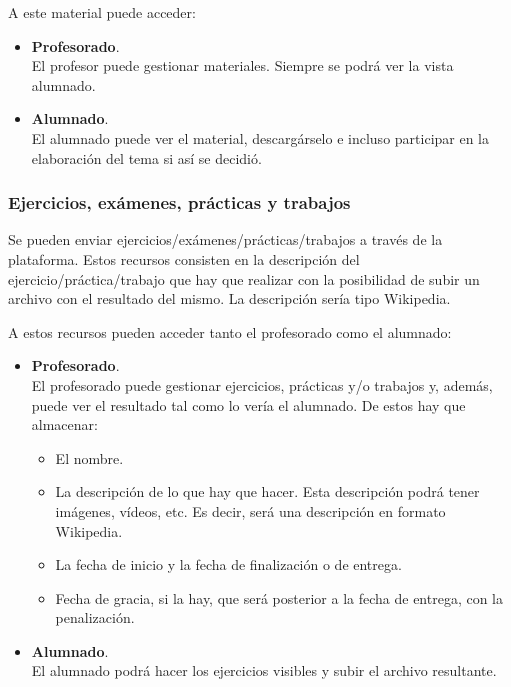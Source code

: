 \documentclass[12pt,twoside,a4paper]{article}
\begin{document}
A este material puede acceder:
\begin{itemize}
\item \textbf{Profesorado}.\\
El profesor puede gestionar materiales. Siempre se podrá ver la vista alumnado.
\item \textbf{Alumnado}.\\
El alumnado puede ver el material, descargárselo e incluso participar en la elaboración del tema si así se decidió.
\end{itemize}

\subsubsection{Ejercicios, exámenes, prácticas y trabajos}
Se pueden enviar ejercicios/exámenes/prácticas/trabajos a través de la plataforma. Estos recursos consisten en la descripción del ejercicio/práctica/trabajo que hay que realizar con la posibilidad de subir un archivo con el resultado del mismo. La descripción sería tipo Wikipedia.

A estos recursos pueden acceder tanto el profesorado como el alumnado:
\begin{itemize}
\item \textbf{Profesorado}.\\
  El profesorado puede gestionar ejercicios, prácticas y/o trabajos y, además, puede ver el resultado tal como lo vería el alumnado. De estos hay que almacenar:
  \begin{itemize}
  \item El nombre.
  \item La descripción de lo que hay que hacer. Esta descripción podrá tener imágenes, vídeos, etc. Es decir, será una descripción en formato Wikipedia.
  \item La fecha de inicio y la fecha de finalización o de entrega.
  \item Fecha de gracia, si la hay, que será posterior a la fecha de entrega, con la penalización.
  \end{itemize}

\item \textbf{Alumnado}.\\
  El alumnado podrá hacer los ejercicios visibles y subir el archivo resultante.
\end{itemize}
\end{document}
